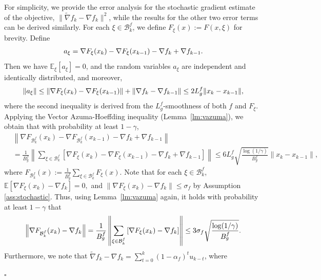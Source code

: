 \documentclass[11pt]{article}
\newenvironment{proof}{{\noindent\it Proof.}\quad}{\hfill $\square$\par}
\begin{document}
\begin{proof}
    For simplicity, we provide the error analysis for the stochastic gradient estimate of the objective, $\|\tilde{\nabla} f_k - \nabla f_k\|^2$, while the results for the other two error terms can be derived similarly. For each $\xi \in \mathcal{B}_k^f$, we define $F_\xi(x) := F(x, \xi)$ for brevity. Define
    \begin{align}
    a_\xi = \nabla F_\xi(x_k) - \nabla F_\xi(x_{k-1}) - \nabla f_k + \nabla f_{k-1}. \notag
    \end{align}
    Then we have  $\mathbb{E}_\xi[a_\xi] = 0$, and the random variables $a_\xi$ are independent and identically distributed, and moreover, 
    \begin{align}
    \|a_\xi\| \leq \|\nabla F_\xi(x_k) - \nabla F_\xi(x_{k-1})\| + \|\nabla f_k - \nabla f_{k-1}\| \leq 2 L_g^f \|x_k - x_{k-1}\|, \notag
    \end{align}
    where the second inequality is  derived from the $L_g^f$-smoothness of both $f$ and $F_\xi$. 
    Applying the Vector Azuma-Hoeffding inequality (Lemma~\ref{lm:vazuma}),  we obtain that with probability at least $1 - \gamma$,  
    \begin{align*}  
        & \left\| \nabla F_{\mathcal{B}_k^f}(x_k) - \nabla F_{\mathcal{B}_k^f}(x_{k-1}) - \nabla f_k + \nabla f_{k-1} \right\| \\  
        &= \frac{1}{B_g^f} \left\| \sum_{\xi \in \mathcal{B}_k^f} \left[ \nabla F_\xi(x_k) - \nabla F_\xi(x_{k-1}) - \nabla f_k + \nabla f_{k-1} \right] \right\|  
        \leq 6 L_g^f \sqrt{\frac{\log(1/\gamma)}{B_g^f}} \|x_k - x_{k-1}\|,
    \end{align*}  
    where $F_{\mathcal{B}_k^f}(x) := \frac{1}{B_g^f} \sum_{\xi \in \mathcal{B}_k^f} F_\xi(x)$.  
    Note that for each $\xi \in \mathcal{B}_k^f$,   
    \( 
    \mathbb{E}[\nabla F_\xi(x_k) - \nabla f_k] = 0, 
    \) 
    and $\|\nabla F_\xi(x_k) - \nabla f_k\| \leq \sigma_f$ by Assumption \ref{ass:stochastic}.  
    Thus, using Lemma~\ref{lm:vazuma} again, it holds with probability at least $1 - \gamma$  that  
    \begin{align}  
        \left\| \nabla F_{\mathcal{B}_k^f}(x_k) - \nabla f_k \right\| = \frac{1}{B_g^f} \left\| \sum_{\xi \in \mathcal{B}_k^f} \left[ \nabla F_\xi(x_k) - \nabla f_k \right] \right\| \leq 3 \sigma_f \sqrt{\frac{\log(1/\gamma)}{B_g^f}}.\notag  
    \end{align}  
    Furthermore, we note that $\tilde \nabla f_k - \nabla f_k = \sum_{t=0}^k (1 - \alpha_f)^t u_{k-t}$, where  

\end{proof}
\end{document}
